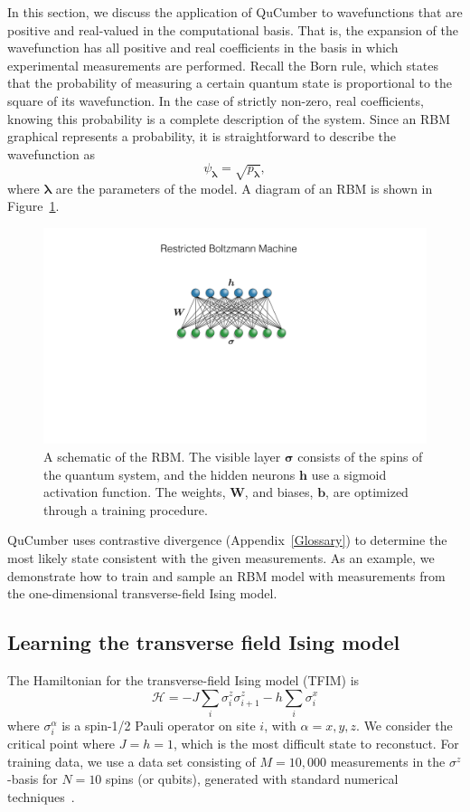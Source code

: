 \documentclass[submission, Phys]{SciPost}
\begin{document}
In this section, we discuss the application of QuCumber to wavefunctions that are positive and real-valued in the computational basis.
That is, the expansion of the wavefunction has all positive and real coefficients in the basis in which experimental
measurements are performed.
Recall the Born rule, which states that the probability of measuring a certain quantum state is proportional to the square of its wavefunction.  
In the case of strictly non-zero, real coefficients, knowing this probability is a complete description of the system. 
Since an RBM graphical represents a probability, it is straightforward to describe the wavefunction as 
\begin{equation}
    \psi_{\bm{\lambda}}= \sqrt{p_{\bm{\lambda}}} \label{wfpd},
\end{equation}  
where ${\bm \lambda}$ are the parameters of the model.
A diagram of an RBM is shown in Figure~\ref{fig:RBM}.

\begin{figure}[htpb]
    \centering
    \includegraphics[width=0.5\linewidth]{plots/ch3_positiveNW.pdf}
    \caption{A schematic of the RBM. 
        The visible layer $\bm{\sigma}$ consists of the spins of the quantum system,    
        and the hidden neurons $\bm{h}$ use a sigmoid activation function. 
    The weights, $\bm{W}$, and biases, $\bm{b}$, are optimized through a training procedure.  }
    \label{fig:RBM}
\end{figure}


QuCumber uses contrastive divergence (Appendix~\ref{Glossary}) to determine the most likely state consistent with the given measurements.
As an example, we demonstrate how to train and sample an RBM model with measurements from the one-dimensional transverse-field Ising model.

\subsection{Learning the transverse field Ising model}
\label{Sec:Training_TFIM}

The Hamiltonian for the transverse-field Ising model (TFIM) is
\begin{equation}
	\mathcal{H} = -J\sum_i \sigma^z_i \sigma^z_{i+1} - h \sum_i \sigma^x_i \label{TFIM}	
\end{equation}
where $\sigma^{\alpha}_i$ is a spin-1/2 Pauli operator on site $i$, with $\alpha=x,y,z$. We consider the critical point where $J=h=1$, which is the most difficult state to reconstuct.
For training data, we use a data set consisting of $M=10,000$ measurements in the $\sigma^z$-basis for $N=10$ spins (or qubits), generated with standard numerical techniques~\cite{itensor}.
\end{document}
